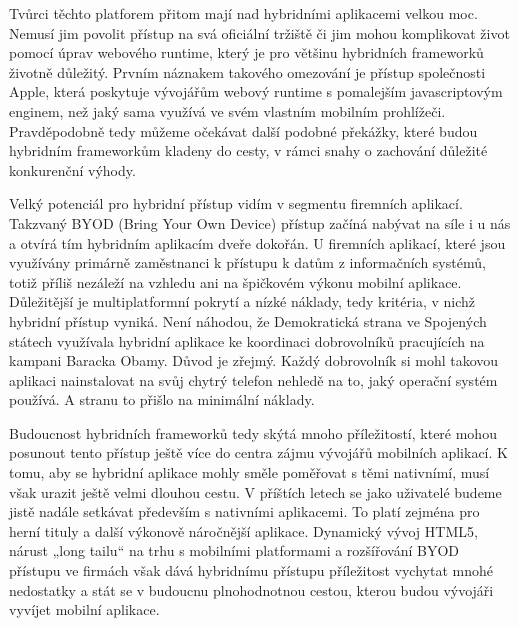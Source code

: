 Tvůrci těchto platforem přitom mají nad hybridními aplikacemi velkou moc. Nemusí jim povolit přístup na svá oficiální tržiště či jim mohou komplikovat život pomocí úprav webového runtime, který je pro většinu hybridních frameworků životně důležitý. Prvním náznakem takového omezování je přístup společnosti Apple, která poskytuje vývojářům webový runtime s pomalejším javascriptovým enginem, než jaký sama využívá ve svém vlastním mobilním prohlížeči. Pravděpodobně tedy můžeme očekávat další podobné překážky, které budou hybridním frameworkům kladeny do cesty, v rámci snahy o zachování důležité konkurenční výhody.


Velký potenciál pro hybridní přístup vidím v segmentu firemních aplikací. Takzvaný BYOD (Bring Your Own Device) přístup začíná nabývat na síle i u nás a otvírá tím hybridním aplikacím dveře dokořán. U firemních aplikací, které jsou využívány primárně zaměstnanci k přístupu k datům z informačních systémů, totiž příliš nezáleží na vzhledu ani na špičkovém výkonu mobilní aplikace. Důležitější je multiplatformní pokrytí a nízké náklady, tedy kritéria, v nichž hybridní přístup vyniká. Není náhodou, že Demokratická strana ve Spojených státech využívala hybridní aplikace ke koordinaci dobrovolníků pracujících na kampani Baracka Obamy. Důvod je zřejmý. Každý dobrovolník si mohl takovou aplikaci nainstalovat na svůj chytrý telefon nehledě na to, jaký operační systém používá. A stranu to přišlo na minimální náklady.


Budoucnost hybridních frameworků tedy skýtá mnoho příležitostí, které mohou posunout tento přístup ještě více do centra zájmu vývojářů mobilních aplikací. K tomu, aby se hybridní aplikace mohly směle poměřovat s těmi nativnímí, musí však urazit ještě velmi dlouhou cestu. V příštích letech se jako uživatelé budeme jistě nadále setkávat především s nativními aplikacemi. To platí zejména pro herní tituly a další výkonově náročnější aplikace. Dynamický vývoj HTML5, nárust „long tailu“ na trhu s mobilními platformami a rozšířování BYOD přístupu ve firmách však dává hybridnímu přístupu příležitost vychytat mnohé nedostatky a stát se v budoucnu plnohodnotnou cestou, kterou budou vývojáři vyvíjet mobilní aplikace.